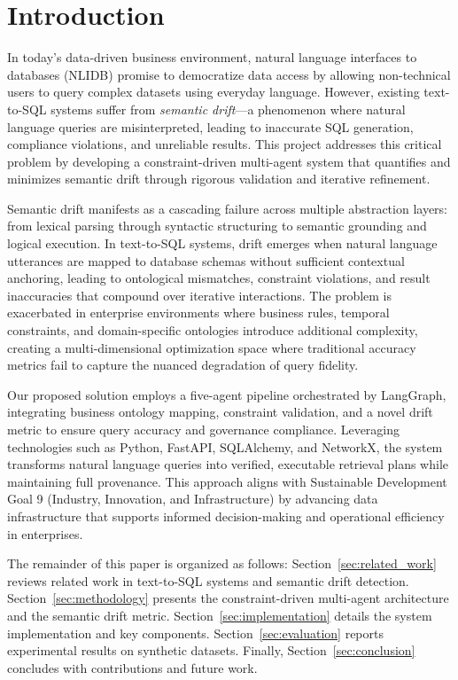 \documentclass[conference]{IEEEtran}
\begin{document}
\section{Introduction}
\label{sec:introduction}

In today's data-driven business environment, natural language interfaces to databases (NLIDB) promise to democratize data access by allowing non-technical users to query complex datasets using everyday language. However, existing text-to-SQL systems suffer from \textit{semantic drift}—a phenomenon where natural language queries are misinterpreted, leading to inaccurate SQL generation, compliance violations, and unreliable results. This project addresses this critical problem by developing a constraint-driven multi-agent system that quantifies and minimizes semantic drift through rigorous validation and iterative refinement.

Semantic drift manifests as a cascading failure across multiple abstraction layers: from lexical parsing through syntactic structuring to semantic grounding and logical execution. In text-to-SQL systems, drift emerges when natural language utterances are mapped to database schemas without sufficient contextual anchoring, leading to ontological mismatches, constraint violations, and result inaccuracies that compound over iterative interactions. The problem is exacerbated in enterprise environments where business rules, temporal constraints, and domain-specific ontologies introduce additional complexity, creating a multi-dimensional optimization space where traditional accuracy metrics fail to capture the nuanced degradation of query fidelity.

Our proposed solution employs a five-agent pipeline orchestrated by LangGraph, integrating business ontology mapping, constraint validation, and a novel drift metric to ensure query accuracy and governance compliance. Leveraging technologies such as Python, FastAPI, SQLAlchemy, and NetworkX, the system transforms natural language queries into verified, executable retrieval plans while maintaining full provenance. This approach aligns with Sustainable Development Goal 9 (Industry, Innovation, and Infrastructure) by advancing data infrastructure that supports informed decision-making and operational efficiency in enterprises.

The remainder of this paper is organized as follows: Section~\ref{sec:related_work} reviews related work in text-to-SQL systems and semantic drift detection. Section~\ref{sec:methodology} presents the constraint-driven multi-agent architecture and the semantic drift metric. Section~\ref{sec:implementation} details the system implementation and key components. Section~\ref{sec:evaluation} reports experimental results on synthetic datasets. Finally, Section~\ref{sec:conclusion} concludes with contributions and future work.
\end{document}

